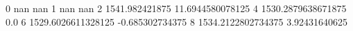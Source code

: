 0 nan nan
1 nan nan
2 1541.982421875 11.6944580078125
4 1530.2879638671875 0.0
6 1529.6026611328125 -0.685302734375
8 1534.2122802734375 3.92431640625
